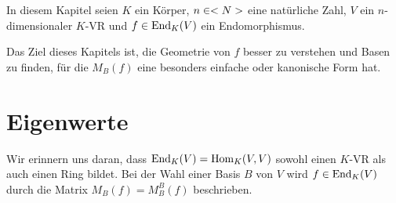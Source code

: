 In diesem Kapitel seien $K$ ein Körper, $n\in<N>$ eine natürliche Zahl, $V$ ein $n$-dimensionaler $K$-VR und $f\in\operatorname{End}_K(V)$ ein Endomorphismus.

Das Ziel dieses Kapitels ist, die Geometrie von $f$ besser zu verstehen und Basen zu finden, für die $M_B(f)$ eine besonders einfache oder kanonische Form hat.

\section{Eigenwerte}

\begin{remark}
	Wir erinnern uns daran, dass $\operatorname{End}_K(V)=\operatorname{Hom}_K(V,V)$ sowohl einen $K$-VR als auch einen Ring bildet. Bei der Wahl einer Basis $B$ von $V$ wird $f\in\operatorname{End}_K(V)$ durch die Matrix $M_B(f)=M_B^B(f)$ beschrieben.	
\end{remark}

